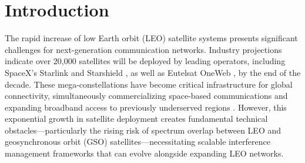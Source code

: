 \documentclass[conference]{IEEEtran}
\begin{document}



\section{Introduction}
\label{sec:intro}

The rapid increase of low Earth orbit (LEO) satellite systems presents significant challenges for next-generation communication networks. Industry projections indicate over 20,000 satellites will be deployed by leading operators, including SpaceX's Starlink \cite{starlink} and Starshield \cite{spacex_starshield}, as well as Eutelsat OneWeb \cite{oneweb}, by the end of the decade. These mega-constellations have become critical infrastructure for global connectivity, simultaneously commercializing space-based communications and expanding broadband access to previously underserved regions \cite{reddyLowEarthOrbit2023}. However, this exponential growth in satellite deployment creates fundamental technical obstacles—particularly the rising risk of spectrum overlap between LEO and geosynchronous orbit (GSO) satellites—necessitating scalable interference management frameworks that can evolve alongside expanding LEO networks.
\end{document}
